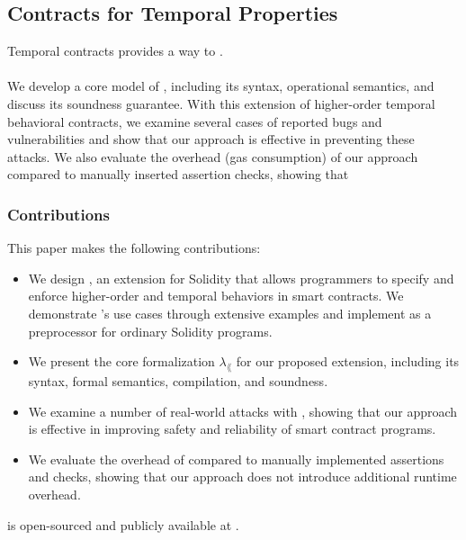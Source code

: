 
\subsection*{\textbf{Contracts for Temporal Properties}}

Temporal contracts provides a way to .

\paragraph{}

We develop a core model of \lang, including its syntax, operational semantics,
and discuss its soundness guarantee.
With this extension of higher-order temporal behavioral contracts, we examine
several cases of reported bugs and vulnerabilities and show that
our approach is effective in preventing these attacks.
We also evaluate the overhead (gas consumption) of our approach
compared to manually inserted assertion checks, showing that 




\subsubsection*{\textbf{Contributions}} This paper makes the following contributions:
\begin{itemize}
  \item We design \lang, an extension for Solidity that allows programmers to
        specify and enforce higher-order and temporal behaviors in smart contracts.
        We demonstrate \lang's use cases through extensive examples and
        implement \lang as a preprocessor for ordinary Solidity programs.
	\item We present the core formalization $\lambda_\lang$ for our proposed
	      extension, including its syntax, formal semantics, compilation, and
	      soundness.
  \item We examine a number of real-world attacks with \lang, showing that our
        approach is effective in improving safety and reliability of smart contract
        programs.
  \item We evaluate the overhead of \lang compared to manually implemented
        assertions and checks, showing that our approach does not introduce
        additional runtime overhead.
\end{itemize}
\lang is open-sourced and publicly available at .

